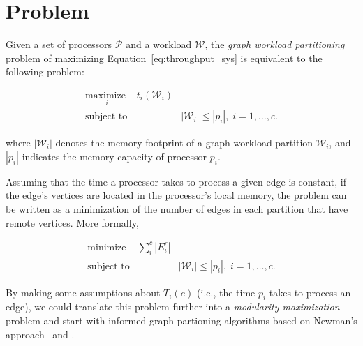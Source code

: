 \section{Problem}
\label{sec:problem}

Given a set of processors $\mathcal{P}$ and a workload $\mathcal{W}$, the {\em graph workload partitioning} problem of maximizing Equation~\ref{eq:throughput_sys} is equivalent to the following problem:

\begin{equation*}
  \begin{aligned}
   \underset{i}{\text{maximize }}
    & t_i(\mathcal{W}_i) \\
    \text{subject to}
    & & |\mathcal{W}_i| \leq |p_i|, \; i = 1, \ldots, c.
  \end{aligned}
\end{equation*}

where $|\mathcal{W}_i|$ denotes the memory footprint of a graph workload partition $\mathcal{W}_i$, and $|p_i|$ indicates the memory capacity of processor $p_i$. 

Assuming that the time a processor takes to process a given edge is constant, if the edge's vertices are located in the processor's local memory, the problem can be written as a minimization of the number of edges in each partition that have remote vertices. More formally,   

\begin{equation*}
  \begin{aligned}
    \text{minimize }
    & \sum_i^c|E_i^r| \\
    \text{subject to}
    & & |\mathcal{W}_i| \leq |p_i|, \; i = 1, \ldots, c.
  \end{aligned}
\end{equation*}

By making some assumptions about $T_i(e)$ (i.e., the time $p_i$ takes to process an edge), we could translate this problem further into a {\em modularity maximization} problem and start with informed graph partioning algorithms based on Newman's approach~\cite{Newman2006} and .


